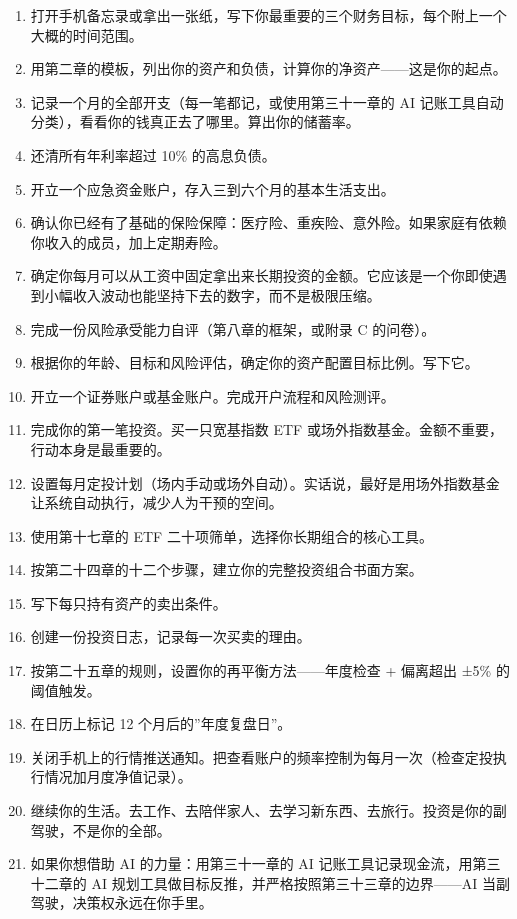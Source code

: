 \documentclass[a4paper,11pt,oneside,fontset=none,UTF8,zihao=-4]{ctexbook}
\providecommand{\tightlist}{\setlength{\itemsep}{2pt}\setlength{\parskip}{1pt}}
\begin{document}
\begin{enumerate}
\def\labelenumi{\arabic{enumi}.}
\tightlist
\item
  打开手机备忘录或拿出一张纸，写下你最重要的三个财务目标，每个附上一个大概的时间范围。
\item
  用第二章的模板，列出你的资产和负债，计算你的净资产------这是你的起点。
\item
  记录一个月的全部开支（每一笔都记，或使用第三十一章的 AI
  记账工具自动分类），看看你的钱真正去了哪里。算出你的储蓄率。
\item
  还清所有年利率超过 10\% 的高息负债。
\item
  开立一个应急资金账户，存入三到六个月的基本生活支出。
\item
  确认你已经有了基础的保险保障：医疗险、重疾险、意外险。如果家庭有依赖你收入的成员，加上定期寿险。
\item
  确定你每月可以从工资中固定拿出来长期投资的金额。它应该是一个你即使遇到小幅收入波动也能坚持下去的数字，而不是极限压缩。
\item
  完成一份风险承受能力自评（第八章的框架，或附录 C 的问卷）。
\item
  根据你的年龄、目标和风险评估，确定你的资产配置目标比例。写下它。
\item
  开立一个证券账户或基金账户。完成开户流程和风险测评。
\item
  完成你的第一笔投资。买一只宽基指数 ETF
  或场外指数基金。金额不重要，行动本身是最重要的。
\item
  设置每月定投计划（场内手动或场外自动）。实话说，最好是用场外指数基金让系统自动执行，减少人为干预的空间。
\item
  使用第十七章的 ETF 二十项筛单，选择你长期组合的核心工具。
\item
  按第二十四章的十二个步骤，建立你的完整投资组合书面方案。
\item
  写下每只持有资产的卖出条件。
\item
  创建一份投资日志，记录每一次买卖的理由。
\item
  按第二十五章的规则，设置你的再平衡方法------年度检查 + 偏离超出 ±5\%
  的阈值触发。
\item
  在日历上标记 12 个月后的''年度复盘日''。
\item
  关闭手机上的行情推送通知。把查看账户的频率控制为每月一次（检查定投执行情况加月度净值记录）。
\item
  继续你的生活。去工作、去陪伴家人、去学习新东西、去旅行。投资是你的副驾驶，不是你的全部。
\item
  如果你想借助 AI 的力量：用第三十一章的 AI
  记账工具记录现金流，用第三十二章的 AI
  规划工具做目标反推，并严格按照第三十三章的边界------AI
  当副驾驶，决策权永远在你手里。
\end{enumerate}
\end{document}
